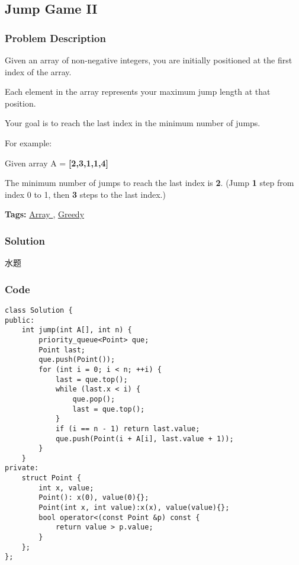 \documentclass{article}
\begin{document}
\begin{CJK*}{UTF8}{gkai}
\subsection{ Jump Game II }
\label{ Jump Game II }

\subsubsection*{Problem Description}
Given an array of non-negative integers, you are initially positioned at the first index of the array.

Each element in the array represents your maximum jump length at that position.

Your goal is to reach the last index in the minimum number of jumps.

For example:


Given array A = \textbf{[2,3,1,1,4]}

The minimum number of jumps to reach the last index is \textbf{2}. (Jump \textbf{1} step from index 0 to 1, then \textbf{3} steps to the last index.)


\textbf{Tags: }
\hyperref[ Array ]{ Array },  \hyperref[ Greedy ]{ Greedy }



\subsubsection*{Solution}
水题

\subsubsection*{Code}
\begin{lstlisting}
class Solution {
public:
    int jump(int A[], int n) {
        priority_queue<Point> que;
        Point last;
        que.push(Point());
        for (int i = 0; i < n; ++i) {
            last = que.top();
            while (last.x < i) {
                que.pop();
                last = que.top();
            }
            if (i == n - 1) return last.value;
            que.push(Point(i + A[i], last.value + 1));
        }
    }
private:
    struct Point {
        int x, value;
        Point(): x(0), value(0){};
        Point(int x, int value):x(x), value(value){};
        bool operator<(const Point &p) const {
            return value > p.value;
        }
    };
}; 
\end{lstlisting}



\end{CJK*}
\end{document}
